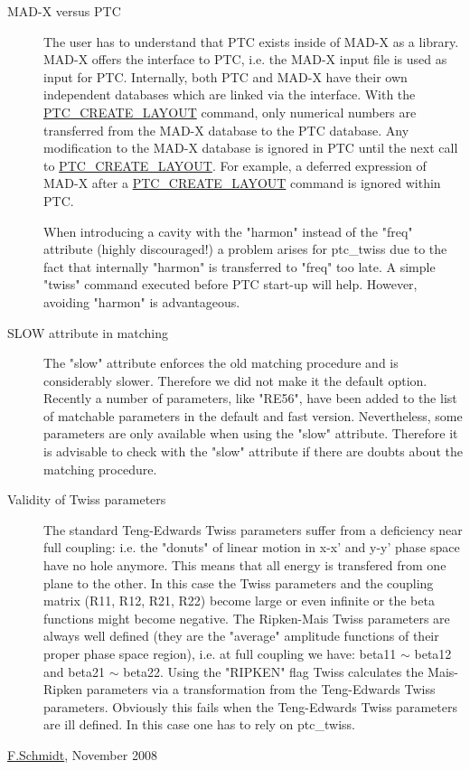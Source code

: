 \begin{description}
	\item[MAD-X versus PTC] 

     The user has to understand that PTC exists inside of MAD-X as a     library. MAD-X offers the interface to PTC, i.e. the MAD-X input     file is used as input for PTC. Internally, both PTC and MAD-X have     their own independent databases which are linked via the     interface. With the \href{../ptc_general/ptc_general.html#PTC_CREATE_LAYOUT}{PTC\_CREATE\_LAYOUT}     command, only numerical numbers are transferred from the MAD-X     database to the PTC database. Any modification to the MAD-X     database is ignored in PTC until the next call to \href{../ptc_general/ptc_general.html#PTC_CREATE_LAYOUT}{PTC\_CREATE\_LAYOUT}.     For example, a deferred expression of MAD-X after a \href{../ptc_general/ptc_general.html#PTC_CREATE_LAYOUT}{PTC\_CREATE\_LAYOUT}     command is ignored within PTC. 

 When introducing a cavity with the "harmon" instead of the "freq" attribute (highly discouraged!) a problem arises for ptc\_twiss due to the fact that internally "harmon" is transferred to "freq" too late. A simple "twiss" command executed before PTC start-up will help. However, avoiding "harmon" is advantageous. 
\end{description}
\begin{description}
	\item[SLOW attribute in matching] 

 The "slow" attribute enforces the old matching procedure and is considerably slower. Therefore we did not make it the default option. Recently a number of parameters, like "RE56", have been added to the list of matchable parameters in the default and fast version. Nevertheless, some parameters are only available when using the "slow" attribute. Therefore it is advisable to check with the "slow" attribute if there are doubts about the matching procedure. 
\end{description}
\begin{description}
	\item[Validity of Twiss parameters] 

 The standard Teng-Edwards Twiss parameters suffer from a deficiency near full coupling: i.e. the "donuts" of linear motion in x-x' and y-y' phase space have no hole anymore. This means that all energy is transfered from one plane to the other. In this case the Twiss parameters and the coupling matrix (R11, R12, R21, R22) become large or even infinite or the beta functions might become negative. The Ripken-Mais Twiss parameters are always well defined (they are the "average" amplitude functions of their proper phase space region), i.e. at full coupling we have: beta11 $\sim$ beta12 and beta21 $\sim$ beta22. Using the "RIPKEN" flag Twiss calculates the Mais-Ripken parameters via a transformation from the Teng-Edwards Twiss parameters. Obviously this fails when the Teng-Edwards Twiss parameters are ill defined. In this case one has to rely on ptc\_twiss.   
\end{description}\href{mailto:Frank.Schmidt@cern.ch}{  F.\nolinebreak Schmidt}, November  2008

